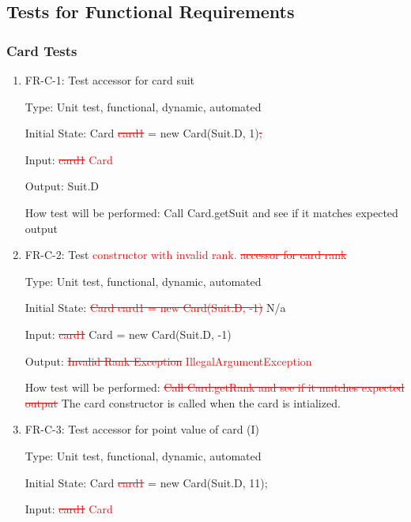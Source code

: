 \documentclass[12pt, titlepage]{article}
\begin{document}
\subsection{Tests for Functional Requirements}
		
\subsubsection{Card Tests}
\begin{enumerate}

    \item {FR-C-1: Test accessor for card suit}
    
    Type: Unit test, functional, dynamic, automated
    					
    Initial State: Card \textcolor{red}{\sout{card1}} = new Card(Suit.D, 1)\textcolor{red}{\sout{;}}
    					
    Input: \textcolor{red}{\sout{card1} Card}
    					
    Output: Suit.D
    					
    How test will be performed: Call Card.getSuit and see if it matches expected output
    
    \item {FR-C-2: Test \textcolor{red}{ constructor with invalid rank.  \textcolor{red}{\sout{accessor for card rank}}}}
    
    Type: Unit test, functional, dynamic, automated
    					
    Initial State: \textcolor{red}{\sout{ Card \textcolor{red}{\sout{card1}} = new Card(Suit.D, -1)}} N/a
    					
    Input:  \textcolor{red}{\sout{card1}} Card = new Card(Suit.D, -1)
    					
    Output: \textcolor{red}{\sout{Invalid Rank Exception} IllegalArgumentException}
    					
    How test will be performed: \textcolor{red}{\sout{ Call Card.getRank and see if it matches expected output}} The card constructor is called when the card is intialized.
    
    \item{FR-C-3: Test accessor for point value of card (I)}
    
    Type: Unit test, functional, dynamic, automated
    					
    Initial State: Card \textcolor{red}{\sout{card1}} = new Card(Suit.D, 11);
    					
    Input:  \textcolor{red}{\sout{card1} Card}
    					

\end{enumerate}
\end{document}

